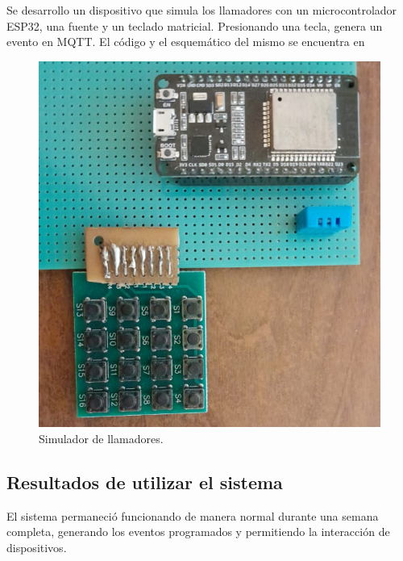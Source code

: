 Se desarrollo un dispositivo que simula los llamadores con un microcontrolador ESP32, una fuente y un teclado matricial. Presionando una tecla, genera un evento en MQTT. El código y el esquemático del mismo se encuentra en \citep{WEBSITE:33} 

\begin{figure}[ht]
	\centering
	\includegraphics[scale=.35]{./Figures/simulador.png}
	\caption{Simulador de llamadores.}
	\label{fig:Simulador de llamadores}
\end{figure}

\subsection{Resultados de utilizar el sistema}

El sistema permaneció funcionando de manera normal durante una semana completa, generando los eventos programados y permitiendo la interacción de dispositivos.
